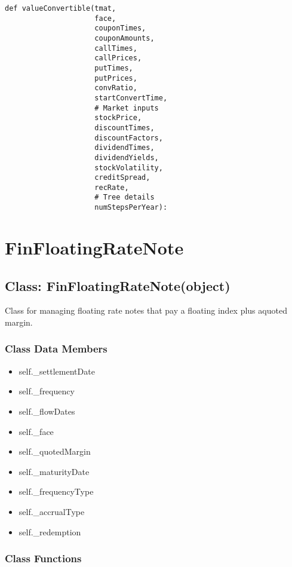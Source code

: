 \documentclass[twoside,11pt]{book}
\begin{document}
\begin{lstlisting}
def valueConvertible(tmat,
                     face,
                     couponTimes,
                     couponAmounts,
                     callTimes,
                     callPrices,
                     putTimes,
                     putPrices,
                     convRatio,
                     startConvertTime,
                     # Market inputs
                     stockPrice,
                     discountTimes,
                     discountFactors,
                     dividendTimes,
                     dividendYields,
                     stockVolatility,
                     creditSpread,
                     recRate,
                     # Tree details
                     numStepsPerYear):
\end{lstlisting}

\newpage
\section{FinFloatingRateNote}

\subsection{Class: FinFloatingRateNote(object)}
Class for managing floating rate notes that pay a floating index plus aquoted margin.

\subsubsection{Class Data Members}
\begin{itemize}
\item{self.\_settlementDate}
\item{self.\_frequency}
\item{self.\_flowDates}
\item{self.\_face}
\item{self.\_quotedMargin}
\item{self.\_maturityDate}
\item{self.\_frequencyType}
\item{self.\_accrualType}
\item{self.\_redemption}
\end{itemize}

\subsubsection{Class Functions}
\end{document}
